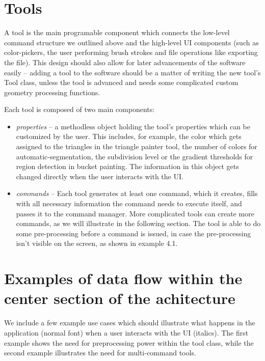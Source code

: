 \section{Tools}

A tool is the main programable component which connects the low-level command structure we outlined above and the high-level UI components (such as color-pickers, the user performing brush strokes and file operations like exporting the file). This design should also allow for later advancements of the software easily -- adding a tool to the software should be a matter of writing the new tool's Tool class, unless the tool is advanced and needs some complicated custom geometry processing functions.

\medskip

Each tool is composed of two main components:
\begin{itemize}
\item \textit{properties} -- a methodless object holding the tool's properties which can be customized by the user. This includes, for example, the color which gets assigned to the triangles in the triangle painter tool, the number of colors for automatic-segmentation, the subdivision level or the gradient thresholds for region detection in bucket painting. The information in this object gets changed directly when the user interacts with the UI.

\item \textit{commands} -- Each tool generates at least one command, which it creates, fills with all necessary information the command needs to execute itself, and passes it to the command manager. More complicated tools can create more commands, as we will illustrate in the following section. The tool is able to do some pre-processing before a command is issued, in case the pre-processing isn't visible on the screen, as shown in example 4.1.

\end{itemize}

\section{Examples of data flow within the center section of the achitecture}

We include a few example use cases which should illustrate what happens in the application (normal font) when a user interacts with the UI (italics). The first example shows the need for preprocessing power within the tool class, while the second example illustrates the need for multi-command tools.

